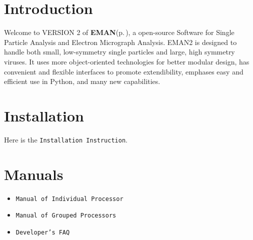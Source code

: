 \section{Introduction}\label{index_intro_sec}
Welcome to VERSION 2 of {\bf EMAN}{\rm (p.\,\pageref{namespaceEMAN})}, a open-source Software for Single Particle Analysis and Electron Micrograph Analysis. EMAN2 is designed to handle both small, low-symmetry single particles and large, high symmetry viruses. It uses more object-oriented technologies for better modular design, has convenient and flexible interfaces to promote extendibility, emphases easy and efficient use in Python, and many new capabilities.\section{Installation}\label{index_install_sec}
Here is the {\tt Installation Instruction}.\section{Manuals}\label{index_manual_sec}
\begin{itemize}
\item {\tt Manual of Individual Processor} \item {\tt Manual of Grouped Processors} \item {\tt Developer's FAQ} \end{itemize}
